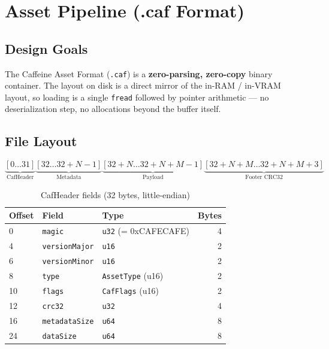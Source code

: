 \chapter{Asset Pipeline (.caf Format)}

\section{Design Goals}

The Caffeine Asset Format (\texttt{.caf}) is a \textbf{zero-parsing,
zero-copy} binary container. The layout on disk is a direct mirror of
the in-RAM / in-VRAM layout, so loading is a single \texttt{fread} followed
by pointer arithmetic --- no deserialization step, no allocations beyond
the buffer itself.

\section{File Layout}

\begin{equation*}
\underbrace{[0\ldots 31]}_{\text{CafHeader}}
\underbrace{[32\ldots 32+N-1]}_{\text{Metadata}}
\underbrace{[32+N\ldots 32+N+M-1]}_{\text{Payload}}
\underbrace{[32+N+M\ldots 32+N+M+3]}_{\text{Footer CRC32}}
\end{equation*}

\begin{table}[H]
\centering
\caption{CafHeader fields (32 bytes, little-endian)}
\begin{tabular}{lllr}
\toprule
\textbf{Offset} & \textbf{Field} & \textbf{Type} & \textbf{Bytes} \\
\midrule
0  & \texttt{magic}        & \texttt{u32} (= 0xCAFECAFE) & 4 \\
4  & \texttt{versionMajor} & \texttt{u16}                & 2 \\
6  & \texttt{versionMinor} & \texttt{u16}                & 2 \\
8  & \texttt{type}         & \texttt{AssetType} (u16)    & 2 \\
10 & \texttt{flags}        & \texttt{CafFlags} (u16)     & 2 \\
12 & \texttt{crc32}        & \texttt{u32}                & 4 \\
16 & \texttt{metadataSize} & \texttt{u64}                & 8 \\
24 & \texttt{dataSize}     & \texttt{u64}                & 8 \\
\bottomrule
\end{tabular}
\end{table}



